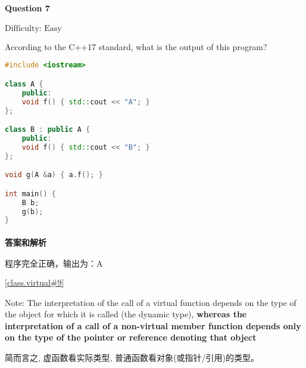 \documentclass{article}
\begin{document}
	\paragraph*{Question 7} $\boxed{\text{Difficulty: Easy}} $			
	
	According to the C++17 standard, what is the output of this program?
	
	\begin{lstlisting}[language=C++]  		
#include <iostream>

class A {
	public:
	void f() { std::cout << "A"; }
};

class B : public A {
	public:
	void f() { std::cout << "B"; }
};

void g(A &a) { a.f(); }

int main() {
	B b;
	g(b);
}
	\end{lstlisting}
	
	\paragraph*{答案和解析} $\boxed{\text{程序完全正确，输出为：A}} $
	
	\href{https://timsong-cpp.github.io/cppwp/n4659/class.virtual#9}{[class.virtual\#9]}
	
	\begin{lightgrayleftbar}
		Note: The interpretation of the call of a virtual function depends on the type of the object for which it is called (the dynamic type), \textbf{whereas the interpretation of a call of a non-virtual member function depends only on the type of the pointer or reference denoting that object}
	\end{lightgrayleftbar}

	简而言之, 虚函数看实际类型, 普通函数看对象(或指针/引用)的类型。
\end{document}
